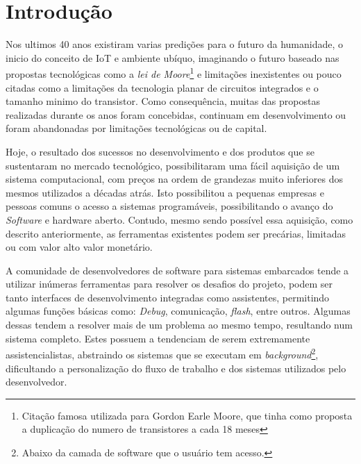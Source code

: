 \chapter{Introdução}
Nos ultimos 40 anos existiram varias predições para o futuro da humanidade, o inicio do conceito de IoT\cite{gates1995estrada} e ambiente ubíquo, imaginando o futuro baseado nas propostas tecnológicas como a \textit{lei de Moore}\footnote{Citação famosa utilizada para Gordon Earle Moore, que tinha como proposta a duplicação do numero de transistores a cada 18 meses} e limitações inexistentes ou pouco citadas como a limitações da tecnologia planar de circuitos integrados e o tamanho minimo do transistor. Como consequência, muitas das propostas realizadas durante os anos foram concebidas, continuam em desenvolvimento ou foram abandonadas por limitações tecnológicas ou de capital.

\iffalse
Muitas das propostas que continuam ativas são extremamente dependentes do desenvolvimento da eletrônica para a sua concepção, encontrando desafios não só para a confecção destes, como também sua utilização pelos desenvolvedores.
\fi

Hoje, o resultado dos sucessos no desenvolvimento e dos produtos que se sustentaram no mercado tecnológico, possibilitaram uma fácil aquisição de um sistema computacional, com preços na ordem de grandezas muito inferiores dos mesmos utilizados a décadas atrás. Isto possibilitou a pequenas empresas e pessoas comuns o acesso a sistemas programáveis, possibilitando o avanço do \textit{Software} e hardware aberto. Contudo, mesmo sendo possível essa aquisição, como descrito anteriormente, as ferramentas existentes podem ser precárias, limitadas ou com valor alto valor monetário.

A comunidade de desenvolvedores de software para sistemas embarcados tende a utilizar inúmeras ferramentas para resolver os desafios do projeto, podem ser tanto interfaces de desenvolvimento integradas como assistentes, permitindo algumas funções básicas como: \textit{Debug}, comunicação, \textit{flash}, entre outros. Algumas dessas tendem a resolver mais de um problema ao mesmo tempo, resultando num sistema completo. Estes possuem a tendenciam de serem extremamente assistencialistas, abstraindo os sistemas que se executam em \textit{background}\footnote{Abaixo da camada de software que o usuário tem acesso.}, dificultando a personalização do fluxo de trabalho e dos sistemas utilizados pelo desenvolvedor.


